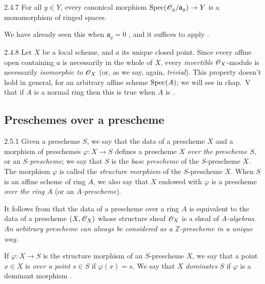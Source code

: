 \documentclass{book}
\begin{document}
\begin{envs}[Corollary]{2.4.7}
\label{cor-1.2.4.7}
For all $y\in Y$, every canonical morphism
${\mathop{\mathrm{Spec}}\nolimits}(\mathscr{O}_y/\mathfrak{a}_y)\to Y$ is a monomorphism of ringed spaces.
\end{envs}
    
We have already seen this when $\mathfrak{a}_y=0$ , and it suffices
to apply .
    
\begin{env}[Remark]{2.4.8}
\label{rmk-1.2.4.8}
Let $X$ be a local scheme, and $a$ its unique
closed point.  Since every affine open containing $a$ is necessarily in the
whole of $X$, every \emph{invertible} $\mathscr{O}_X$-module  is
necessarily \emph{isomorphic to $\mathscr{O}_X$} (or, as we say, again, \emph{trivial}).
This property doesn't hold in general, for an arbitrary affine scheme
${\mathop{\mathrm{Spec}}\nolimits}(A)$; we will see in chap.~V that if $A$ is a normal ring then this is
true when $A$ is .
\end{env}

\subsection{Preschemes over a prescheme}
\label{1-schemes-2.5}

\begin{env}[Definition]{2.5.1}
\label{defn-1.2.5.1}
Given a prescheme $S$, we say that the data of a
prescheme $X$ and a morphism of preschemes $\varphi\colon X\to S$ defines a
prescheme $X$ \emph{over the prescheme $S$}, or an \emph{$S$-prescheme}; we say
that $S$ is the \emph{base prescheme} of the $S$-prescheme $X$. The morphism
$\varphi$ is called the \emph{structure morphism} of the $S$-prescheme $X$.
When $S$ is an affine scheme of ring $A$, we also say that $X$ endowed with
$\varphi$ is a prescheme \emph{over the ring $A$} (or an \emph{$A$-prescheme}).
\end{env}

It follows from  that the data of a prescheme over a ring $A$ is
equivalent to the data of a prescheme $(X,\mathscr{O}_X)$ whose structure sheaf $\mathscr{O}_X$ is
a sheaf of \emph{$A$-algebras}. \emph{An arbitrary prescheme can always be
considered as a $\mathbb{Z}$-prescheme in a unique way.}

If $\varphi\colon X\to S$ is the structure morphism of an $S$-prescheme $X$, we
say that a point $x\in X$ is \emph{over a point $s\in S$} if $\varphi(x)=s$.  We
say that $X$ \emph{dominates} $S$ if $\varphi$ is a dominant morphism .
\end{document}
